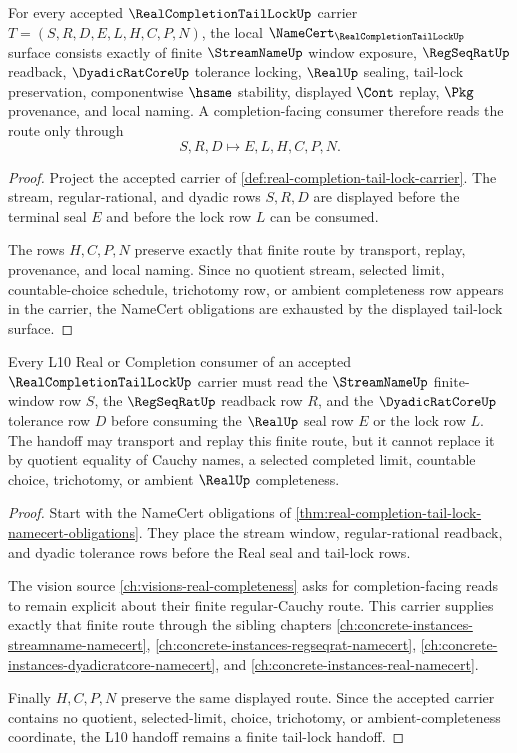 \begin{theorem}
\label{thm:real-completion-tail-lock-namecert-obligations}
For every accepted $\RealCompletionTailLockUp$ carrier $T=(S,R,D,E,L,H,C,P,N)$, the local $\NameCert_{\RealCompletionTailLockUp}$ surface consists exactly of finite $\StreamNameUp$ window exposure, $\RegSeqRatUp$ readback, $\DyadicRatCoreUp$ tolerance locking, $\RealUp$ sealing, tail-lock preservation, componentwise $\hsame$ stability, displayed $\Cont$ replay, $\Pkg$ provenance, and local naming. A completion-facing consumer therefore reads the route only through
$$
S,R,D \longmapsto E,L,H,C,P,N .
$$
\end{theorem}
\begin{proof}
Project the accepted carrier of \autoref{def:real-completion-tail-lock-carrier}. The stream, regular-rational, and dyadic rows $S,R,D$ are displayed before the terminal seal $E$ and before the lock row $L$ can be consumed.

The rows $H,C,P,N$ preserve exactly that finite route by transport, replay, provenance, and local naming. Since no quotient stream, selected limit, countable-choice schedule, trichotomy row, or ambient completeness row appears in the carrier, the NameCert obligations are exhausted by the displayed tail-lock surface.
\end{proof}

\begin{theorem}
\label{thm:real-completion-tail-lock-l10-handoff}
Every L10 Real or Completion consumer of an accepted $\RealCompletionTailLockUp$ carrier must read the $\StreamNameUp$ finite-window row $S$, the $\RegSeqRatUp$ readback row $R$, and the $\DyadicRatCoreUp$ tolerance row $D$ before consuming the $\RealUp$ seal row $E$ or the lock row $L$. The handoff may transport and replay this finite route, but it cannot replace it by quotient equality of Cauchy names, a selected completed limit, countable choice, trichotomy, or ambient $\RealUp$ completeness.
\end{theorem}
\begin{proof}
Start with the NameCert obligations of \autoref{thm:real-completion-tail-lock-namecert-obligations}. They place the stream window, regular-rational readback, and dyadic tolerance rows before the Real seal and tail-lock rows.

The vision source \autoref{ch:visions-real-completeness} asks for completion-facing reads to remain explicit about their finite regular-Cauchy route. This carrier supplies exactly that finite route through the sibling chapters \autoref{ch:concrete-instances-streamname-namecert}, \autoref{ch:concrete-instances-regseqrat-namecert}, \autoref{ch:concrete-instances-dyadicratcore-namecert}, and \autoref{ch:concrete-instances-real-namecert}.

Finally $H,C,P,N$ preserve the same displayed route. Since the accepted carrier contains no quotient, selected-limit, choice, trichotomy, or ambient-completeness coordinate, the L10 handoff remains a finite tail-lock handoff.
\end{proof}

